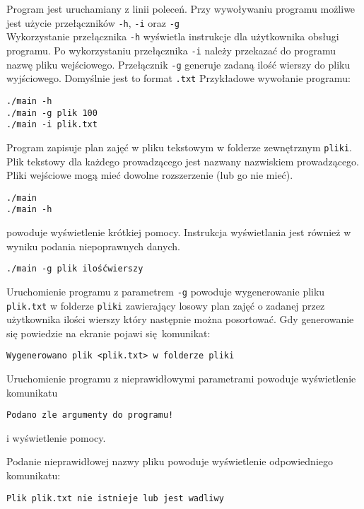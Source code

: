 \documentclass[12pt,a4paper,oneside]{article}
\begin{document}
Program jest uruchamiany z linii poleceń. 
Przy wywoływaniu programu możliwe jest użycie przełączników  \texttt{-h},  \texttt{-i} oraz \texttt{-g}\\
Wykorzystanie przełącznika  \texttt{-h} wyświetla instrukcje dla użytkownika obsługi programu. 
Po wykorzystaniu przełącznika  \texttt{-i} należy przekazać do programu nazwę pliku wejściowego.
Przełącznik \texttt{-g} generuje zadaną ilość wierszy do pliku wyjściowego. Domyślnie jest to format \texttt{.txt} \newline \newline
Przykładowe wywołanie programu:
\begin{verbatim}
./main -h
./main -g plik 100
./main -i plik.txt
\end{verbatim}

Program zapisuje plan zajęć w pliku tekstowym w folderze zewnętrznym \texttt{pliki}. Plik tekstowy dla każdego prowadzącego jest nazwany nazwiskiem prowadzącego.
Pliki wejściowe mogą mieć dowolne rozszerzenie (lub go nie mieć).

\begin{verbatim}
./main 
./main -h
\end{verbatim}
powoduje wyświetlenie krótkiej pomocy. Instrukcja wyświetlania jest również w wyniku podania niepoprawnych danych. 

\begin{verbatim}
./main -g plik ilośćwierszy
\end{verbatim}  \phantom{} 
\indent Uruchomienie programu z parametrem \texttt{-g} powoduje wygenerowanie pliku \texttt{plik.txt} w folderze \texttt{pliki} zawierający losowy plan zajęć o zadanej przez użytkownika ilości wierszy który następnie można posortować. Gdy generowanie się powiedzie na ekranie pojawi się komunikat:
\begin{verbatim}
Wygenerowano plik <plik.txt> w folderze pliki
\end{verbatim}  \phantom{} 
\indent Uruchomienie programu z nieprawidłowymi parametrami powoduje wyświetlenie komunikatu
\begin{verbatim}
Podano zle argumenty do programu!
\end{verbatim} \phantom{} 
i wyświetlenie pomocy. \newline 

Podanie nieprawidłowej nazwy pliku powoduje wyświetlenie odpowiedniego komunikatu:
\begin{verbatim}
Plik plik.txt nie istnieje lub jest wadliwy
\end{verbatim}
\end{document}
